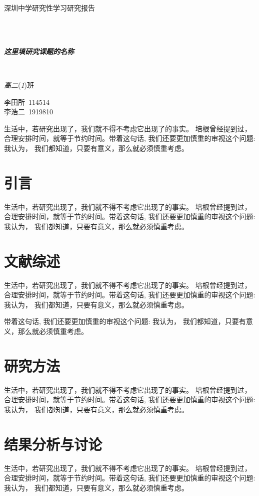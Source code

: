 \documentclass[12pt]{report} %
\newcommand{\stdtitle}[3]{%
	\vspace*{\fill}
	\begin{center}
		{\fontsize{42pt}{0pt}深圳中学研究性学习研究报告}
	\end{center}
	~\\~\\
	\begin{center}
		{\fontsize{18pt}{0pt}\textbf{\emph{#1}}}
	\end{center}
	~\\
	\begin{center}
		\songti\emph{#2}\textrm{(\emph{#3})}班
	\end{center}
	\vspace*{\fill}
	\newpage
}
\begin{document}
	\stdtitle{这里填研究课题的名称}{高二}{1}
	\begin{center}\fontsize{18pt}{0pt}\end{center}
	\begin{center}%
		李田所\ 114514 \\
		李浩二\ 1919810 \\
	\end{center}
	
	
	\begin{center}\fontsize{16pt}{0pt}\end{center}
	
	生活中，若研究出现了，我们就不得不考虑它出现了的事实。 培根曾经提到过，合理安排时间，就等于节约时间。带着这句话, 我们还要更加慎重的审视这个问题: 我认为， 我们都知道，只要有意义，那么就必须慎重考虑。 
	\newpage
	\section{引言}
	生活中，若研究出现了，我们就不得不考虑它出现了的事实。 培根曾经提到过，合理安排时间，就等于节约时间。带着这句话, 我们还要更加慎重的审视这个问题: 我认为， 我们都知道，只要有意义，那么就必须慎重考虑。 
	\newpage
	
	\section{文献综述}
	生活中，若研究出现了，我们就不得不考虑它出现了的事实。 培根曾经提到过，合理安排时间，就等于节约时间。带着这句话, 我们还要更加慎重的审视这个问题: 我认为， 我们都知道，只要有意义，那么就必须慎重考虑。 
	
	带着这句话, 我们还要更加慎重的审视这个问题: 我认为， 我们都知道，只要有意义，那么就必须慎重考虑。 
	\newpage
	\section{研究方法}
	生活中，若研究出现了，我们就不得不考虑它出现了的事实。 培根曾经提到过，合理安排时间，就等于节约时间。带着这句话, 我们还要更加慎重的审视这个问题: 我认为， 我们都知道，只要有意义，那么就必须慎重考虑。 
	\section{结果分析与讨论}
	
	生活中，若研究出现了，我们就不得不考虑它出现了的事实。 培根曾经提到过，合理安排时间，就等于节约时间。带着这句话, 我们还要更加慎重的审视这个问题: 我认为， 我们都知道，只要有意义，那么就必须慎重考虑。 
	
\end{document}
